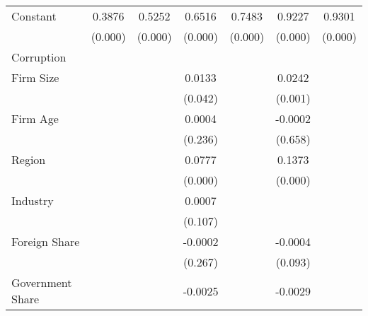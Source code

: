 {\begin{tabular}{l*{6}{c}}
Constant            &      0.3876\sym{***}&      0.5252\sym{***}&      0.6516\sym{***}&      0.7483\sym{***}&      0.9227\sym{***}&      0.9301\sym{***}\\
                    &     (0.000)         &     (0.000)         &     (0.000)         &     (0.000)         &     (0.000)         &     (0.000)         \\
\hline
Corruption          &                     &                     &                     &                     &                     &                     \\
Firm Size           &                     &                     &      0.0133\sym{*}  &                     &      0.0242\sym{***}&                     \\
                    &                     &                     &     (0.042)         &                     &     (0.001)         &                     \\
Firm Age            &                     &                     &      0.0004         &                     &     -0.0002         &                     \\
                    &                     &                     &     (0.236)         &                     &     (0.658)         &                     \\
Region              &                     &                     &      0.0777\sym{***}&                     &      0.1373\sym{***}&                     \\
                    &                     &                     &     (0.000)         &                     &     (0.000)         &                     \\
Industry            &                     &                     &      0.0007         &                     &                     &                     \\
                    &                     &                     &     (0.107)         &                     &                     &                     \\
Foreign Share       &                     &                     &     -0.0002         &                     &     -0.0004         &                     \\
                    &                     &                     &     (0.267)         &                     &     (0.093)         &                     \\
Government Share    &                     &                     &     -0.0025\sym{***}&                     &     -0.0029\sym{***}&                     \\

\end{tabular}}
